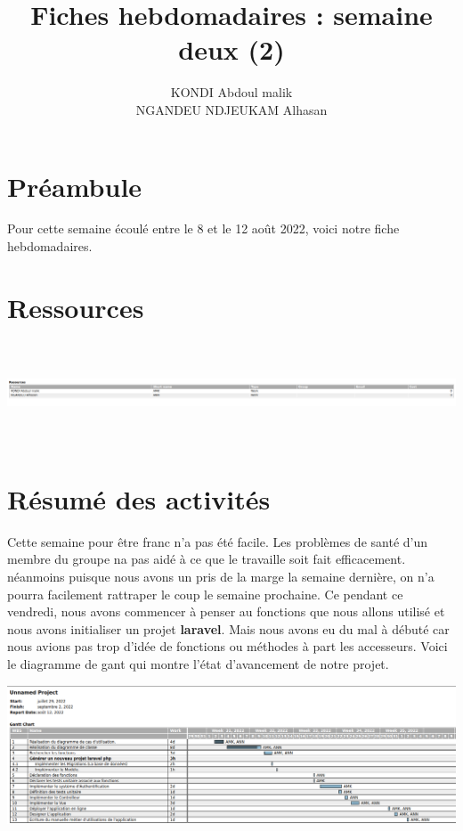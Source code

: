 \documentclass[12pt,a4paper]{article}
\author{KONDI Abdoul malik \\ NGANDEU NDJEUKAM Alhasan}
\title{Fiches hebdomadaires : semaine deux (2)}
\begin{document}
\maketitle
\tableofcontents
\newpage

\section{Préambule}
	Pour cette semaine écoulé entre le 8 et le 12 août 2022, voici notre fiche hebdomadaires.\\

\section{Ressources}
\includegraphics[height=3cm,width=16cm]{images/resources.png}

\section{Résumé des activités}
	Cette semaine pour être franc n'a pas été facile. Les problèmes de santé d'un membre du groupe na pas aidé
	à ce que le travaille soit fait efficacement. néanmoins puisque nous avons un pris de la marge la semaine dernière, 
	on n'a pourra facilement rattraper le coup le semaine prochaine. Ce pendant ce vendredi, nous avons commencer à penser au fonctions que nous allons utilisé et nous avons initialiser un projet \textbf{laravel}. Mais nous avons eu du mal à débuté car nous avions pas trop d'idée de fonctions ou méthodes à part les accesseurs. Voici le diagramme de gant qui montre l'état d'avancement de notre projet.

\includegraphics[scale=0.3]{images/jour10.png}

\end{document}
